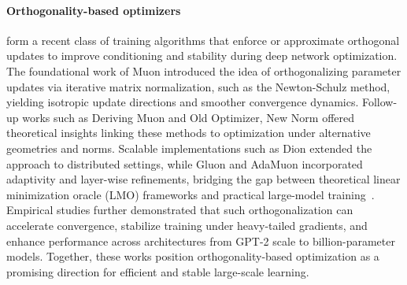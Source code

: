 \paragraph{Orthogonality-based optimizers} form a recent class of training algorithms that enforce or approximate orthogonal updates to improve conditioning and stability during deep network optimization. The foundational work of Muon \cite{jordan2024muon} introduced the idea of orthogonalizing parameter updates via iterative matrix normalization, such as the Newton-Schulz method, yielding isotropic update directions and smoother convergence dynamics. Follow-up works such as Deriving Muon \cite{bernstein2025deriving} and Old Optimizer, New Norm \cite{bernstein2024oldoptimizernewnorm} offered theoretical insights linking these methods to optimization under alternative geometries and norms. Scalable implementations such as Dion \cite{ahn_dion_2025} extended the approach to distributed settings, while Gluon \cite{riabinin_gluon_2025} and AdaMuon \cite{si_adamuon_2025} incorporated adaptivity and layer-wise refinements, bridging the gap between theoretical linear minimization oracle (LMO) frameworks and practical large-model training~\cite{pethick2025training}. Empirical studies \cite{modded_nanogpt_2024, wen_fantastic_2025, kimi2025k2} further demonstrated that such orthogonalization can accelerate convergence, stabilize training under heavy-tailed gradients, and enhance performance across architectures from GPT-2 scale to billion-parameter models. Together, these works position orthogonality-based optimization as a promising direction for efficient and stable large-scale learning.

